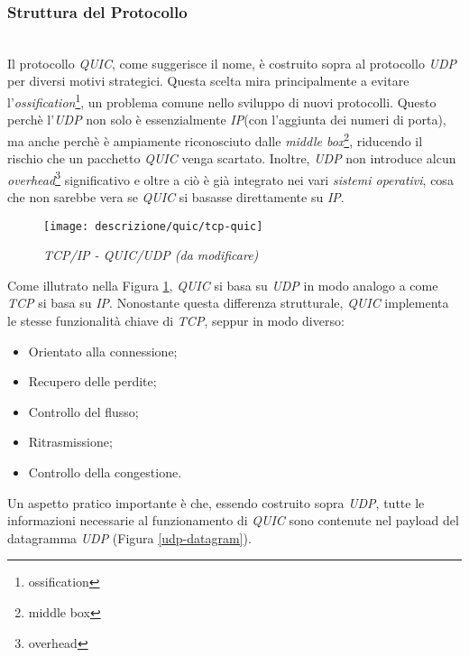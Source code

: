 \subsubsection{Struttura del Protocollo}
~\\ 
\indent Il protocollo \emph{QUIC}, come suggerisce il nome, è costruito sopra al protocollo \emph{UDP} per diversi motivi strategici. Questa scelta mira principalmente a evitare l'\emph{ossification}\footnote{\gls{ossification}}, un problema comune nello sviluppo di nuovi protocolli.
Questo perchè l'\emph{UDP} non solo è essenzialmente \emph{IP}(con l'aggiunta dei numeri di porta), ma anche perchè è ampiamente riconosciuto dalle \emph{middle box}\footnote{\gls{middle box}}, riducendo il rischio che un pacchetto \emph{QUIC} venga scartato.
Inoltre, \emph{UDP} non introduce alcun \emph{overhead}\footnote{\gls{overhead}} significativo e oltre a ciò è già integrato nei vari \emph{sistemi operativi}, cosa che non sarebbe vera se \emph{QUIC} si basasse direttamente su \emph{IP}.
\\
\begin{figure}[!h]
    \centering
    \texttt{[image: descrizione/quic/tcp-quic]}
    \caption{\emph{TCP/IP - QUIC/UDP (da modificare)}}
    \label{tcp-quic}
\end{figure}
\noindent Come illutrato nella Figura \ref{tcp-quic}, \emph{QUIC} si basa su \emph{UDP} in modo analogo a come \emph{TCP} si basa su \emph{IP}.
Nonostante questa differenza strutturale, \emph{QUIC} implementa le stesse funzionalità chiave di \emph{TCP}, seppur in modo diverso:
\begin{itemize}
    \item Orientato alla connessione;
    \item Recupero delle perdite;
    \item Controllo del flusso;
    \item Ritrasmissione;
    \item Controllo della congestione.
\end{itemize}

\noindent Un aspetto pratico importante è che, essendo costruito sopra \emph{UDP}, tutte le informazioni necessarie al funzionamento di \emph{QUIC} sono contenute nel payload del datagramma \emph{UDP} (Figura \ref{udp-datagram}).
